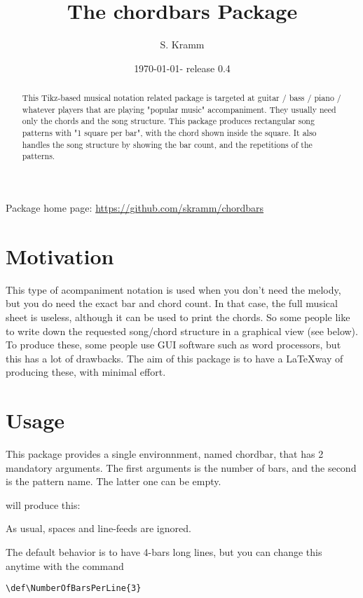 \documentclass[11pt]{article}
\title{The chordbars Package}
\author{S. Kramm}
\date{\today - release 0.4}
\begin{document}
\maketitle

\begin{abstract}
This Tikz-based musical notation related package is targeted at guitar / bass / piano / whatever players that are playing "popular music" accompaniment.
They usually need only the chords and the song structure.
This package produces rectangular song patterns with "1 square per bar", with the chord shown inside the square.
It also handles the song structure by showing the bar count, and the repetitions of the patterns.
\end{abstract}

Package home page: \url{https://github.com/skramm/chordbars}

\section{Motivation}

This type of acompaniment notation is used when you don't need the melody, but you do need the exact bar and chord count.
In that case, the full musical sheet is useless, although it can be used to print the chords.
So some people like to write down the requested song/chord structure in a graphical view (see below). To produce these, some people use GUI software such as word processors, but this has a lot of drawbacks.
The aim of this package is to have a \LaTeX way of producing these, with minimal effort.


\section{Usage}
This package provides a single environnment, named {\ttfamily chordbar}, that has 2 mandatory arguments.
The first arguments is the number of bars, and the second is the pattern name. The latter one can be empty.





will produce this:



As usual, spaces and line-feeds are ignored.

The default behavior is to have 4-bars long lines, but you can change this anytime with the command 

\begin{lstlisting}
\def\NumberOfBarsPerLine{3}
\end{lstlisting}
\end{document}

